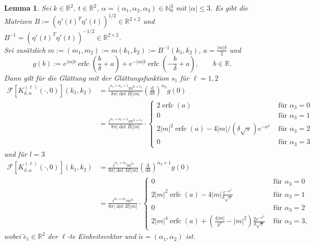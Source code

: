 \documentclass[12pt,a4paper]{scrartcl}
\newtheorem{Lemma}[Satz]{Lemma}
\newcommand{\dd}{\mathrm{d}}
\numberwithin{equation}{section}
\newcommand{\R}{\mathbb{R}} %
\newcommand{\N}{\mathbb{N}} %
\newcommand{\F}{\mathcal{F}} %
\newcommand{\erfc}{\operatorname{erfc}}
\begin{document}
\begin{Lemma} \label{LFKdelta}
Sei $k \in \R^2$, $t\in \R^2$, $\alpha=(\alpha_1,\alpha_2,\alpha_3) \in \N_0^3$ mit $|\alpha| \leq 3$.
Es gibt die Matrizen $B:=(\eta'(t)^T\eta'(t))^{1/2} \in \R^{2 \times 2}$ und $B^{-1}=(\eta'(t)^T\eta'(t))^{-1/2} \in \R^{2 \times 2}$. \\
Sei zusätzlich $m:=(m_1,m_2):=m(k_1,k_2):=B^{-1}(k_1,k_2)$, $a=\frac{|m|\delta}{2}$ und 
\[
g(b) := e^{|m|b} \erfc \left(\frac{b}{\delta}+ a \right) + e^{-|m| b} \erfc \left( - \frac{b}{\delta}+ a \right), \qquad b\in \R.
\]
Dann gilt für die Glättung mit der Glättungsfunktion $s_1$ für $\ell=1,2$ 
\begin{align*}
\F [K_{\delta,\alpha}^{(\ell)}(\cdot,0)](k_1,k_2) 
&= \frac{i^{\alpha_1+\alpha_2+1} m^{\tilde \alpha+ \tilde e_\ell}}{8 \pi|\det B| |m|} \left(\frac{\dd}{\dd b}\right)^{\alpha_3}g(0) \\
&= \frac{i^{\alpha_1+\alpha_2+1} m^{\tilde \alpha+ \tilde e_\ell}}{8 \pi|\det B| |m|} \cdot
\begin{cases}
2 \erfc(a) & \text{ für }\alpha_3=0\\
0 &\text{ für }\alpha_3=1\\
2 |m|^2 \erfc(a)-4|m|/(\delta \sqrt{\pi})e^{-a^2} &\text{ für }\alpha_3=2\\
0 &\text{ für }\alpha_3=3
\end{cases}
\end{align*} und für $l=3$
\begin{align*}
\F [K_{\delta,\alpha}^{(\ell)}(\cdot,0)](k_1,k_2) 
&= \frac{i^{\alpha_1 + \alpha_2}  m^{\tilde \alpha}}{8 \pi |\det M| |m|}\left(\frac{\dd}{\dd b}\right)^{\alpha_3 +1}g(0) \\
&= \frac{i^{\alpha_1+\alpha_2} m^{\tilde \alpha}}{8 \pi|\det B| |m|} \cdot
\begin{cases}
0 &\text{ für }\alpha_3=0\\
2 |m|^2 \erfc(a)-4|m| \frac{e^{-a^2}}{\delta \sqrt{\pi}} &\text{ für }\alpha_3=1\\
0 &\text{ für }\alpha_3=2 \\
2|m|^4 \erfc(a)+ \left(\frac{4|m|}{\delta^2}-|m|^2 \right)\frac{2 e^{-a^2}}{\delta \sqrt{\pi}}  &\text{ für }\alpha_3=3,
\end{cases}
\end{align*}
wobei $\tilde e_\ell \in \R^2$ der $\ell$-te Einheitsvektor und $\tilde \alpha = (\alpha_1,\alpha_2)$ ist.
\end{Lemma}
\end{document}
